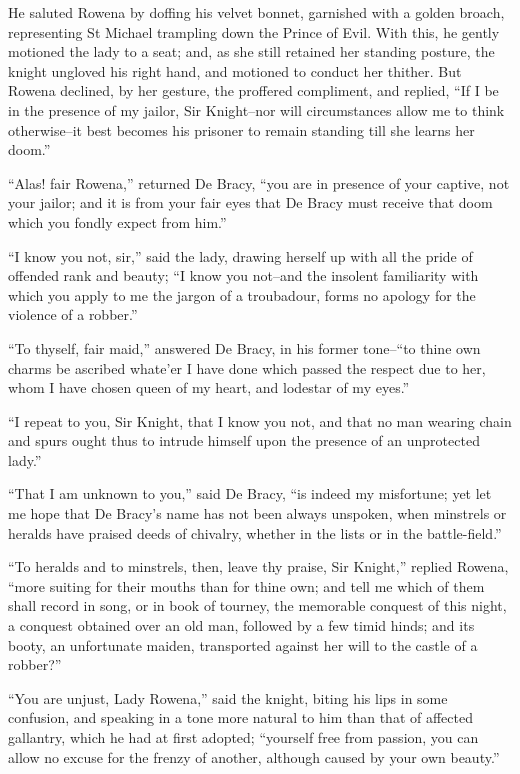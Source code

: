 He saluted Rowena by doffing his velvet bonnet, garnished with a golden
broach, representing St Michael trampling down the Prince of Evil. With
this, he gently motioned the lady to a seat; and, as she still retained
her standing posture, the knight ungloved his right hand, and motioned
to conduct her thither. But Rowena declined, by her gesture, the
proffered compliment, and replied, ``If I be in the presence of my
jailor, Sir Knight--nor will circumstances allow me to think
otherwise--it best becomes his prisoner to remain standing till she
learns her doom.''

``Alas! fair Rowena,'' returned De Bracy, ``you are in presence of your
captive, not your jailor; and it is from your fair eyes that De Bracy
must receive that doom which you fondly expect from him.''

``I know you not, sir,'' said the lady, drawing herself up with all the
pride of offended rank and beauty; ``I know you not--and the insolent
familiarity with which you apply to me the jargon of a troubadour, forms
no apology for the violence of a robber.''

``To thyself, fair maid,'' answered De Bracy, in his former tone--``to
thine own charms be ascribed whate'er I have done which passed the
respect due to her, whom I have chosen queen of my heart, and lodestar
of my eyes.''

``I repeat to you, Sir Knight, that I know you not, and that no man
wearing chain and spurs ought thus to intrude himself upon the presence
of an unprotected lady.''

``That I am unknown to you,'' said De Bracy, ``is indeed my misfortune;
yet let me hope that De Bracy's name has not been always unspoken, when
minstrels or heralds have praised deeds of chivalry, whether in the
lists or in the battle-field.''

``To heralds and to minstrels, then, leave thy praise, Sir Knight,''
replied Rowena, ``more suiting for their mouths than for thine own; and
tell me which of them shall record in song, or in book of tourney, the
memorable conquest of this night, a conquest obtained over an old man,
followed by a few timid hinds; and its booty, an unfortunate maiden,
transported against her will to the castle of a robber?''

``You are unjust, Lady Rowena,'' said the knight, biting his lips in
some confusion, and speaking in a tone more natural to him than that of
affected gallantry, which he had at first adopted; ``yourself free from
passion, you can allow no excuse for the frenzy of another, although
caused by your own beauty.''

